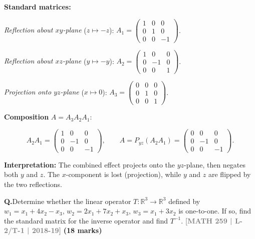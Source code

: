 \documentclass[12pt,a3paper]{article}
\newcommand{\yr}[1]{\hfill\textcolor{gray}{\small\textbf{[#1]}}}
\newcommand{\mk}[1]{\textcolor{orange!70!black}{\small\textbf{(#1 marks)}}}
\newcounter{qnum}
\newcommand{\Q}[1]{%
  \needspace{4\baselineskip}
  \refstepcounter{qnum}
  \vspace{6pt}
  \noindent\textbf{Q\theqnum.}\enspace #1\par
}
\begin{document}
\begin{tcolorbox}[enhanced,breakable,
  colback=cF!4,colframe=cF,boxrule=0.8pt,arc=5pt,
  title={\textbf{Answer --- Composition: Reflect$(xy)$ $\to$ Reflect$(xz)$ $\to$ Project$(yz)$}},
  fonttitle=\bfseries\color{white},colbacktitle=cF]

\textbf{Standard matrices:}

\textit{Reflection about $xy$-plane} ($z\mapsto-z$):
$A_1=\begin{pmatrix}1&0&0\\0&1&0\\0&0&-1\end{pmatrix}$.

\textit{Reflection about $xz$-plane} ($y\mapsto-y$):
$A_2=\begin{pmatrix}1&0&0\\0&-1&0\\0&0&1\end{pmatrix}$.

\textit{Projection onto $yz$-plane} ($x\mapsto0$):
$A_3=\begin{pmatrix}0&0&0\\0&1&0\\0&0&1\end{pmatrix}$.

\textbf{Composition} $A=A_3A_2A_1$:

\[
A_2A_1=\begin{pmatrix}1&0&0\\0&-1&0\\0&0&-1\end{pmatrix},
\qquad
A=P_{yz}(A_2A_1)=\begin{pmatrix}0&0&0\\0&-1&0\\0&0&-1\end{pmatrix}.
\]

\textbf{Interpretation:} The combined effect projects onto the $yz$-plane, then negates both $y$ and $z$. The $x$-component is lost (projection), while $y$ and $z$ are flipped by the two reflections.

\end{tcolorbox}


\Q{Determine whether the linear operator $T: \mathbb{R}^3 \to \mathbb{R}^3$ defined by $w_1 = x_1 + 4x_2 - x_3$, $w_2 = 2x_1 + 7x_2 + x_3$, $w_3 = x_1 + 3x_2$ is one-to-one. If so, find the standard matrix for the inverse operator and find $T^{-1}$.
\yr{MATH 259 | L-2/T-1 | 2018-19} \mk{18}}
\end{document}

